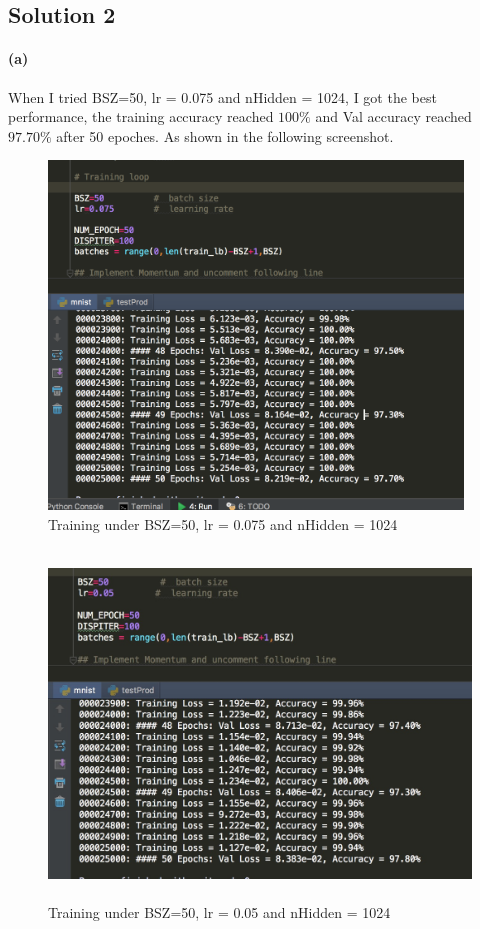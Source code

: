 \documentclass{article}
\newcommand{\solution}[1]{\clearpage \subsection*{Solution #1}}  %
\newcommand{\spart}[1]{\paragraph{(#1)}}
\begin{document}
\solution{2}
\spart{a}
When I tried BSZ=50, lr = 0.075 and nHidden = 1024, I got the best performance, the training accuracy reached $100\%$ and Val accuracy reached $97.70\%$ after 50 epoches. As shown in the following screenshot.
\begin{figure}[h!]
  \centering
	\includegraphics[height=25em]{screenshots/prob2(a)50_0075_1024.png}
	\caption{Training under BSZ=50, lr = 0.075 and nHidden = 1024}
\end{figure}
\begin{figure}[h!]
  \centering
	\includegraphics[height=25em]{screenshots/prob2(a)50-005-1024.png}
	\caption{Training under BSZ=50, lr = 0.05 and nHidden = 1024}
\end{figure}
\end{document}

